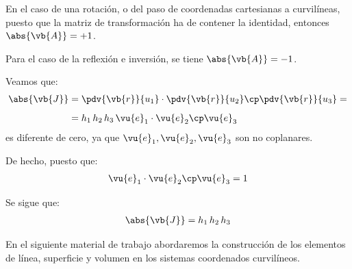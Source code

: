 En el caso de una rotación, o del paso de coordenadas cartesianas a curvilíneas, puesto que la matriz de transformación ha de contener la identidad, entonces $\abs{\vb{A}} = +1$.
 
Para el caso de la reflexión e inversión, se tiene $\abs{\vb{A}} = -1$.

Veamos que:
\begin{align*}
\abs{\vb{J}} &= \pdv{\vb{r}}{u_{1}} \cdot \pdv{\vb{r}}{u_{2}} \cp \pdv{\vb{r}}{u_{3}} = \\[0.5em]
&= h_{1} \, h_{2} \, h_{3} \, \vu{e}_{1} \cdot \vu{e}_{2} \cp \vu{e}_{3}
\end{align*}
es diferente de cero, ya que $\vu{e}_{1}, \vu{e}_{2}, \vu{e}_{3}$ son no coplanares.
\par

De hecho, puesto que:
\begin{align*}
\vu{e}_{1} \cdot \vu{e}_{2} \cp \vu{e}_{3} = 1
\end{align*}

Se sigue que:
\begin{align*}
\abs{\vb{J}} = h_{1} \, h_{2} \, h_{3}
\end{align*}

En el siguiente material de trabajo abordaremos la construcción de los elementos de línea, superficie y volumen en los sistemas coordenados curvilíneos.
